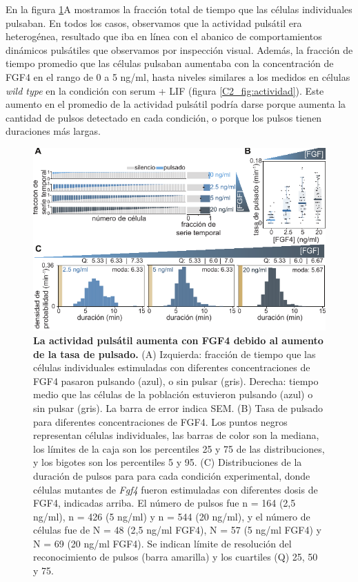 \documentclass[./main.tex]{subfiles}
\begin{document}
En la figura \ref{C3_fig:FGF_actividad}A mostramos la fracción total de tiempo que las células individuales pulsaban. En todos los casos, observamos que la actividad pulsátil era heterogénea, resultado que iba en línea con el abanico de comportamientos dinámicos pulsátiles que observamos por inspección visual. Además, la fracción de tiempo promedio que las células pulsaban aumentaba con la concentración de FGF4 en el rango de 0 a 5 ng/ml, hasta niveles similares a los medidos en células \textit{wild type} en la condición con serum + LIF (figura \ref{C2_fig:actividad}). Este aumento en el promedio de la actividad pulsátil podría darse porque aumenta la cantidad de pulsos detectado en cada condición, o porque los pulsos tienen duraciones más largas. 


\begin{figure}
    \centering
    \includegraphics[width=1\columnwidth]{figures/chapter3/C3_FGF_activity.pdf} \caption{\textbf{La actividad pulsátil aumenta con FGF4 debido al aumento de la tasa de pulsado.} (A) Izquierda: fracción de tiempo que las células individuales estimuladas con diferentes concentraciones de FGF4 pasaron pulsando (azul), o sin pulsar (gris). Derecha: tiempo medio que las células de la población estuvieron pulsando (azul) o sin pulsar (gris). La barra de error indica SEM. (B) Tasa de pulsado para diferentes concentraciones de FGF4. Los puntos negros representan células individuales, las barras de color son la mediana, los límites de la caja son los percentiles 25 y 75 de las distribuciones, y los bigotes son los percentiles 5 y 95. (C) Distribuciones de la duración de pulsos para para cada condición experimental, donde células mutantes de \textit{Fgf4} fueron estimuladas con diferentes dosis de FGF4, indicadas arriba. El número de pulsos fue n = 164 (2,5 ng/ml), n = 426 (5 ng/ml) y n = 544 (20 ng/ml), y el número de células fue de N = 48 (2,5 ng/ml FGF4), N = 57 (5 ng/ml FGF4) y N = 69 (20 ng/ml FGF4). Se indican límite de resolución del reconocimiento de pulsos (barra amarilla) y los cuartiles (Q) 25, 50 y 75.}
    \label{C3_fig:FGF_actividad}
\end{figure}
\end{document}
